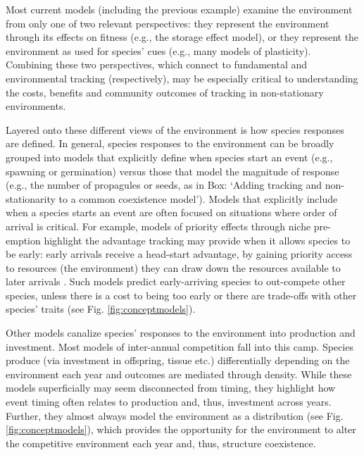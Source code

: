 \documentclass[11pt,letterpaper]{article}
\begin{document}
Most current models (including the previous example) examine the environment from only one of two relevant perspectives: they represent the environment through its effects on fitness (e.g., the storage effect model), or they represent the environment as used for species' cues (e.g., many models of plasticity). Combining these two perspectives, which connect to fundamental and environmental tracking (respectively), may be especially critical to understanding the costs, benefits and community outcomes of tracking in non-stationary environments. 

Layered onto these different views of the environment is how species responses are defined. In general, species responses to the environment can be broadly grouped into models that explicitly define when species start an event (e.g., spawning or germination) versus those that model the magnitude of response (e.g., the number of propagules or seeds, as in Box: `Adding tracking and non-stationarity to a common coexistence model'). Models that explicitly include when a species starts an event are often focused on situations where order of arrival is critical. For example, models of priority effects through niche pre-emption highlight the advantage tracking may provide when it allows species to be early: early arrivals receive a head-start advantage, by gaining priority access to resources (the environment) they can draw down the resources available to later arrivals \citep{fukami2015}. Such models predict early-arriving species to out-compete other species, unless there is a cost to being too early or there are trade-offs with other species' traits (see Fig. \ref{fig:conceptmodels}).

Other models canalize species' responses to the environment into production and investment. Most models of inter-annual competition \citep[most explicit examples of `modern coexistence theory,' e.g.,][]{Chesson:2004eo,Angert:2009} fall into this camp. Species produce (via investment in offspring, tissue etc.) differentially depending on the environment each year and outcomes are mediated through density. While these models superficially may seem disconnected from timing, they highlight how event timing often relates to production and, thus, investment across years. Further, they almost always model the environment as a distribution (see Fig. \ref{fig:conceptmodels}), which provides the opportunity for the environment to alter the competitive environment each year and, thus, structure coexistence. 
\end{document}
